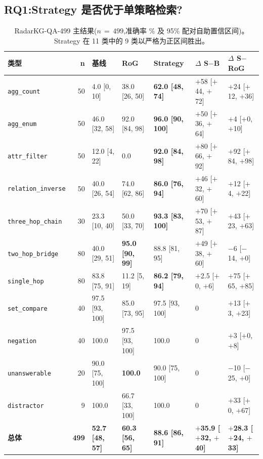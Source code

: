 \documentclass[11pt,a4paper]{article}
\newcommand{\qtype}[1]{\texttt{\small #1}}
\begin{document}
\subsection{RQ1:Strategy 是否优于单策略检索?}
\label{sec:rq1}

\begin{table}[t]
\centering\small
\caption{RadarKG-QA-499 主结果($n\,{=}\,499$,准确率 \% 及 95\% 配对自助置信区间)。Strategy 在 11 类中的 9 类以严格为正区间胜出。}
\label{tab:main}
\setlength{\tabcolsep}{3.5pt}
\begin{tabular}{l r l l l l l}
\toprule
\textbf{类型} & \textbf{n} & \textbf{基线} & \textbf{RoG} & \textbf{Strategy} & \textbf{$\Delta$ S$-$B} & \textbf{$\Delta$ S$-$RoG} \\
\midrule
\qtype{agg\_count}        & 50 & 4.0 [0, 10] & 38.0 [26, 50] & \textbf{62.0 [48, 74]} & $+$58 [$+$44, $+$72] & $+$24 [$+$12, $+$36] \\
\qtype{agg\_enum}         & 50 & 46.0 [32, 58] & 92.0 [84, 98] & \textbf{96.0 [90, 100]} & $+$50 [$+$36, $+$64] & $+$4 [$+$0, $+$10] \\
\qtype{attr\_filter}      & 50 & 12.0 [4, 22]  & 0.0           & \textbf{92.0 [84, 98]} & $+$80 [$+$66, $+$92] & $+$92 [$+$84, $+$98] \\
\qtype{relation\_inverse} & 50 & 40.0 [26, 54] & 74.0 [62, 86] & \textbf{86.0 [76, 94]} & $+$46 [$+$32, $+$60] & $+$12 [$+$4, $+$22] \\
\qtype{three\_hop\_chain} & 30 & 23.3 [10, 40] & 50.0 [33, 70] & \textbf{93.3 [83, 100]} & $+$70 [$+$53, $+$87] & $+$43 [$+$23, $+$63] \\
\qtype{two\_hop\_bridge}  & 80 & 40.0 [29, 51] & \textbf{95.0 [90, 99]} & 88.8 [81, 95] & $+$49 [$+$38, $+$60] & $-$6 [$-$14, $+$0] \\
\qtype{single\_hop}       & 80 & 83.8 [75, 91] & 11.2 [5, 19]  & \textbf{86.2 [79, 94]} & $+$2.5 [$+$0, $+$6] & $+$75 [$+$65, $+$85] \\
\qtype{set\_compare}      & 40 & 97.5 [93, 100] & 85.0 [73, 95] & 97.5 [93, 100] & 0 & $+$13 [$+$3, $+$23] \\
\qtype{negation}          & 40 & 100.0          & 97.5 [93, 100] & 100.0 & 0 & $+$3 [$+$0, $+$8] \\
\qtype{unanswerable}      & 20 & 90.0 [75, 100] & \textbf{100.0} & 90.0 [75, 100] & 0 & $-$10 [$-$25, $+$0] \\
\qtype{distractor}        & 9  & 100.0          & 66.7 [33, 100] & 100.0 & 0 & $+$33 [$+$0, $+$67] \\
\midrule
\textbf{总体} & \textbf{499} & \textbf{52.7 [48, 57]} & \textbf{60.3 [56, 65]} & \textbf{88.6 [86, 91]} & \textbf{$+$35.9 [$+$32, $+$40]} & \textbf{$+$28.3 [$+$24, $+$33]} \\
\bottomrule
\end{tabular}
\end{table}
\end{document}

